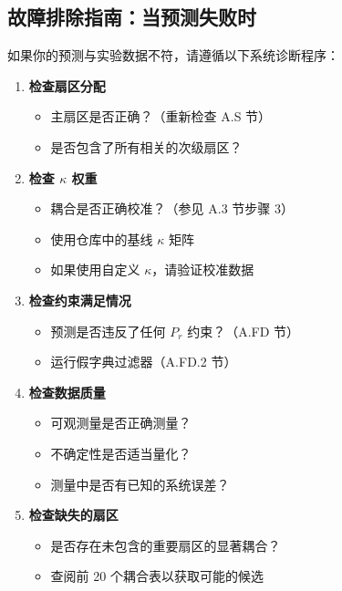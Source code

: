 \documentclass[11pt,a4paper]{article}
\begin{document}
	\subsection*{故障排除指南：当预测失败时}
	
	如果你的预测与实验数据不符，请遵循以下系统诊断程序：
	
	\begin{enumerate}
		\item \textbf{检查扇区分配} 
		\begin{itemize}
			\item 主扇区是否正确？（重新检查 A.S 节）
			\item 是否包含了所有相关的次级扇区？
		\end{itemize}
		
		\item \textbf{检查 $\kappa$ 权重}
		\begin{itemize}
			\item 耦合是否正确校准？（参见 A.3 节步骤 3）
			\item 使用仓库中的基线 $\kappa$ 矩阵
			\item 如果使用自定义 $\kappa$，请验证校准数据
		\end{itemize}
		
		\item \textbf{检查约束满足情况}
		\begin{itemize}
			\item 预测是否违反了任何 $P_r$ 约束？（A.FD 节）
			\item 运行假字典过滤器（A.FD.2 节）
		\end{itemize}
		
		\item \textbf{检查数据质量}
		\begin{itemize}
			\item 可观测量是否正确测量？
			\item 不确定性是否适当量化？
			\item 测量中是否有已知的系统误差？
		\end{itemize}
		
		\item \textbf{检查缺失的扇区}
		\begin{itemize}
			\item 是否存在未包含的重要扇区的显著耦合？
			\item 查阅前 20 个耦合表以获取可能的候选
		\end{itemize}
		

\end{enumerate}
\end{document}

